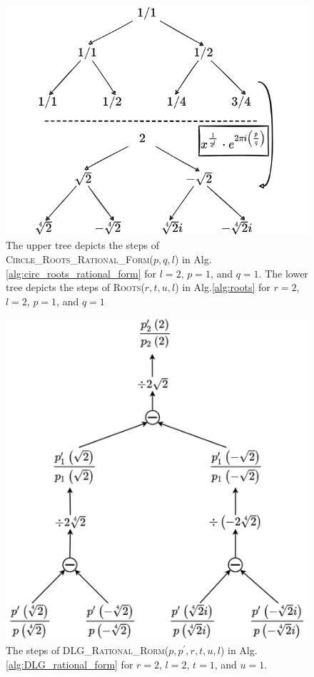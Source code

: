\documentclass[sigconf]{acmart}
\begin{document}
\begin{figure}[h]
  \centering
  \includegraphics[width=\linewidth]{rational_root_tree.png}
  \caption{The upper tree depicts the steps of \textsc{\textsc{Circle\_Roots\_Rational\_Form}}($p,q,l$) in Alg.\ref{alg:circ_roots_rational_form} for $l=2$, $p=1$, and $q=1$. The lower tree depicts the steps of \textsc{Roots}($r,t,u,l$) in Alg.\ref{alg:roots} for $r=2$, $l=2$, $p=1$, and $q=1$}
  \Description{}
\end{figure}

\begin{figure}[h]
  \centering
  \includegraphics[width=\linewidth]{p_prime.png}
  \caption{The steps of \textsc{DLG\_Rational\_Rorm}($p,p^\prime,r,t,u,l$) in Alg.\ref{alg:DLG_rational_form} for $r=2$, $l=2$, $t=1$, and $u=1$.}
  \Description{}
\end{figure}
\end{document}
